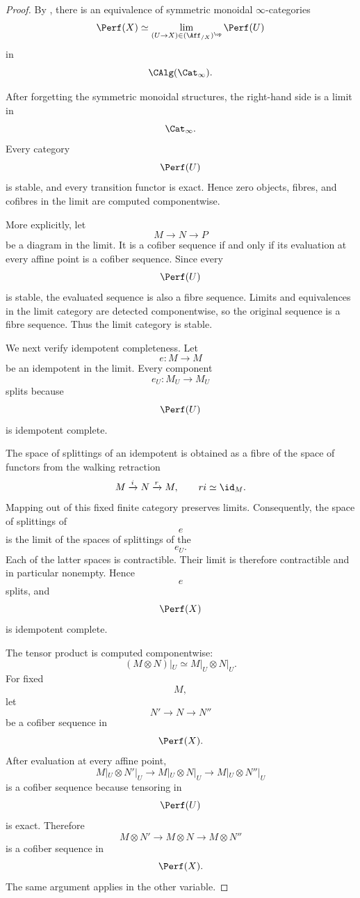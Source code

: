 \begin{proof}
By
,
there is an equivalence of symmetric monoidal $\infty$-categories
\[
    \Perf(X)
    \simeq
    \lim_{
        (U\to X)\in(\Aff_{/X})^{\op}
    }
    \Perf(U)
\]
in
\[
    \CAlg(\Cat_\infty).
\]

After forgetting the symmetric monoidal structures, the right-hand side
is a limit in
\[
    \Cat_\infty.
\]
Every category
\[
    \Perf(U)
\]
is stable, and every transition functor is exact. Hence zero objects,
fibres, and cofibres in the limit are computed componentwise.

More explicitly, let
\[
    M\longrightarrow N\longrightarrow P
\]
be a diagram in the limit. It is a cofiber sequence if and only if its
evaluation at every affine point is a cofiber sequence. Since every
\[
    \Perf(U)
\]
is stable, the evaluated sequence is also a fibre sequence. Limits and
equivalences in the limit category are detected componentwise, so the
original sequence is a fibre sequence. Thus the limit category is stable.

We next verify idempotent completeness. Let
\[
    e
    \colon
    M
    \longrightarrow
    M
\]
be an idempotent in the limit. Every component
\[
    e_U
    \colon
    M_U
    \longrightarrow
    M_U
\]
splits because
\[
    \Perf(U)
\]
is idempotent complete.

The space of splittings of an idempotent is obtained as a fibre of the
space of functors from the walking retraction
\[
    M
    \xrightarrow{i}
    N
    \xrightarrow{r}
    M,
    \qquad
    r i\simeq\id_M.
\]
Mapping out of this fixed finite category preserves limits. Consequently,
the space of splittings of
\[
    e
\]
is the limit of the spaces of splittings of the
\[
    e_U.
\]
Each of the latter spaces is contractible. Their limit is therefore
contractible and in particular nonempty. Hence
\[
    e
\]
splits, and
\[
    \Perf(X)
\]
is idempotent complete.

The tensor product is computed componentwise:
\[
    (M\otimes N)|_U
    \simeq
    M|_U\otimes N|_U.
\]
For fixed
\[
    M,
\]
let
\[
    N'\longrightarrow N\longrightarrow N''
\]
be a cofiber sequence in
\[
    \Perf(X).
\]
After evaluation at every affine point,
\[
    M|_U\otimes N'|_U
    \longrightarrow
    M|_U\otimes N|_U
    \longrightarrow
    M|_U\otimes N''|_U
\]
is a cofiber sequence because tensoring in
\[
    \Perf(U)
\]
is exact. Therefore
\[
    M\otimes N'
    \longrightarrow
    M\otimes N
    \longrightarrow
    M\otimes N''
\]
is a cofiber sequence in
\[
    \Perf(X).
\]
The same argument applies in the other variable.


\end{proof}
